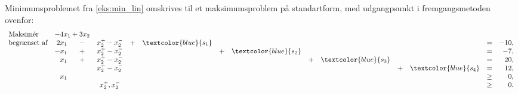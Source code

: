 %
\begin{eks}
Minimumsproblemet fra \ref{eks:min_lin} omskrives til et maksimumsproblem på standartform, med udgangpsunkt i fremgangsmetoden ovenfor:
%
\begin{align*}
\begin{array}{lrcccrcrcrcrcrcr}
\text{Maksimér}		&	\multicolumn{2}{c}{-4x_1 + 3x_2}\\
\text{begrænset af}	&2x_1	&-	&x_2^+-x_2^-		&+	&\textcolor{blue}{s_1}&	&	&	&	&	&	&= 		&-10,\\
					&-x_1	&+	&x_2^+-x_2^-		&	&	&+	&\textcolor{blue}{s_2} &	&	&	&	&=		& -7,\\
					&x_1	&+	&x_2^+-x_2^-		&	&	&	&	&+	&\textcolor{blue}{s_3}&	&	&=		& 20,\\
					& 		&	&x_2^+-x_2^-&	&	&	&	&	&	&+	&\textcolor{blue}{s_4} &=		& 12,\\
					&x_1	&	&			&	&	&	&	&	&	&	&	&\geq	& 0,\\
					&		&	&x_2^+,x_2^-&	&	&	&	&	&	&	&	&\geq	& 0.\\
\end{array}
\end{align*}
\end{eks}
%